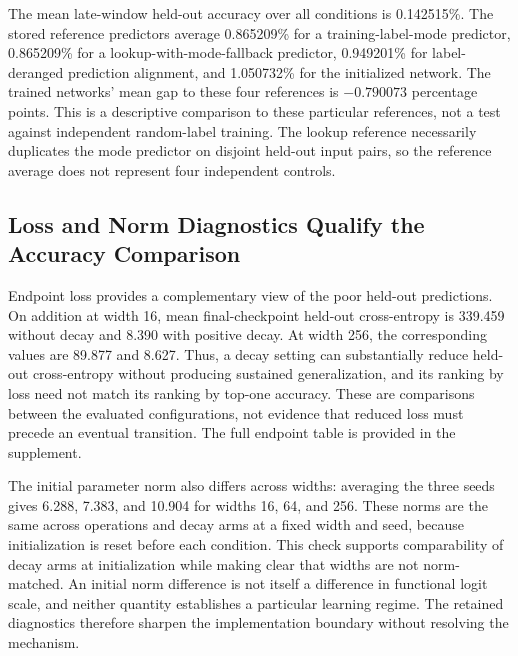 \documentclass{article}
\begin{document}
The mean late-window held-out accuracy over all conditions is 0.142515\%. The stored reference predictors average 0.865209\% for a training-label-mode predictor, 0.865209\% for a lookup-with-mode-fallback predictor, 0.949201\% for label-deranged prediction alignment, and 1.050732\% for the initialized network. The trained networks' mean gap to these four references is $-0.790073$ percentage points. This is a descriptive comparison to these particular references, not a test against independent random-label training. The lookup reference necessarily duplicates the mode predictor on disjoint held-out input pairs, so the reference average does not represent four independent controls.

\subsection{Loss and Norm Diagnostics Qualify the Accuracy Comparison}

Endpoint loss provides a complementary view of the poor held-out predictions. On addition at width 16, mean final-checkpoint held-out cross-entropy is 339.459 without decay and 8.390 with positive decay. At width 256, the corresponding values are 89.877 and 8.627. Thus, a decay setting can substantially reduce held-out cross-entropy without producing sustained generalization, and its ranking by loss need not match its ranking by top-one accuracy. These are comparisons between the evaluated configurations, not evidence that reduced loss must precede an eventual transition. The full endpoint table is provided in the supplement.

The initial parameter norm also differs across widths: averaging the three seeds gives 6.288, 7.383, and 10.904 for widths 16, 64, and 256. These norms are the same across operations and decay arms at a fixed width and seed, because initialization is reset before each condition. This check supports comparability of decay arms at initialization while making clear that widths are not norm-matched. An initial norm difference is not itself a difference in functional logit scale, and neither quantity establishes a particular learning regime. The retained diagnostics therefore sharpen the implementation boundary without resolving the mechanism.
\end{document}

